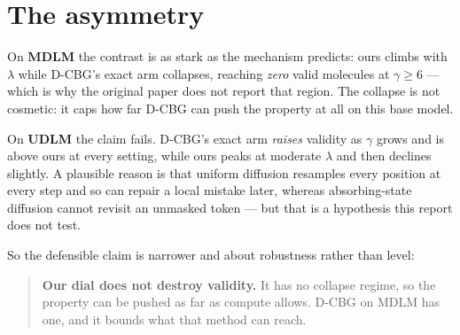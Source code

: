 \documentclass[11pt]{article}
\begin{document}
\begin{table}[htbp]
\centering
\small
{}
\caption{ring count: valid molecules out of 1{,}024 as the strength dial is turned up. Ours along $\lambda$ at the largest $N$; D-CBG along $\gamma$.}
\label{tab:val-dial-ring_count}
\end{table}

\section{The asymmetry}\label{sec:asym}

On \textbf{MDLM} the contrast is as stark as the mechanism predicts: ours climbs
with $\lambda$ while D-CBG's exact arm collapses, reaching \emph{zero} valid
molecules at $\gamma \geq 6$ --- which is why the original paper does not report
that region. The collapse is not cosmetic: it caps how far D-CBG can push the
property at all on this base model.

On \textbf{UDLM} the claim fails. D-CBG's exact arm \emph{raises} validity as
$\gamma$ grows and is above ours at every setting, while ours peaks at moderate
$\lambda$ and then declines slightly. A plausible reason is that uniform
diffusion resamples every position at every step and so can repair a local
mistake later, whereas absorbing-state diffusion cannot revisit an unmasked
token --- but that is a hypothesis this report does not test.

So the defensible claim is narrower and about robustness rather than level:

\begin{quote}
\textbf{Our dial does not destroy validity.} It has no collapse regime, so the
property can be pushed as far as compute allows. D-CBG on MDLM has one, and it
bounds what that method can reach.
\end{quote}
\end{document}
